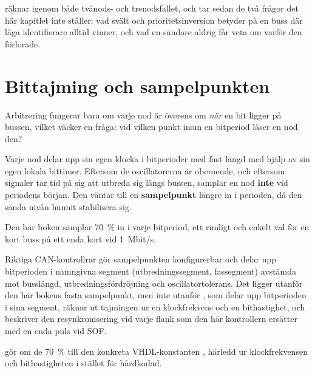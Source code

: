  räknar igenom både tvånods- och trenodsfallet, och tar sedan de två frågor det här
kapitlet inte ställer: vad svält och prioritetsinversion betyder på en buss där låga identifierare
alltid vinner, och vad en sändare aldrig får veta om varför den förlorade.

\section{Bittajming och sampelpunkten}
\label{c10:sec:bittiming}

Arbitrering fungerar bara om varje nod är överens om \emph{när} en bit ligger på bussen, vilket
väcker en fråga: vid vilken punkt inom en bitperiod läser en nod den?

Varje nod delar upp sin egen klocka i bitperioder med fast längd med hjälp av sin egen lokala
bittimer. Eftersom de oscillatorerna är oberoende, och eftersom signaler tar tid på sig att utbreda
sig längs bussen, samplar en nod \textbf{inte} vid periodens början. Den väntar till en
\textbf{sampelpunkt} längre in i perioden, då den sända nivån hunnit stabilisera sig.

Den här boken samplar 70~\% in i varje bitperiod, ett rimligt och enkelt val för en kort buss på ett
enda kort vid 1~Mbit/s.

Riktiga CAN-kontrollrar gör sampelpunkten konfigurerbar och delar upp bitperioden i namngivna
segment (utbredningssegment, fassegment) avstämda mot busslängd, utbredningsfördröjning och
oscillatortolerans. Det ligger utanför den här bokens fasta sampelpunkt, men inte utanför
, som delar upp bitperioden i sina segment, räknar ut tajmingen ur en klockfrekvens och en
bithastighet, och beskriver den resynkronisering vid varje flank som den här kontrollern ersätter
med en enda puls vid SOF.

 gör om de 70~\% till den konkreta VHDL-konstanten , härledd
ur klockfrekvensen och bithastigheten i stället för hårdkodad.
